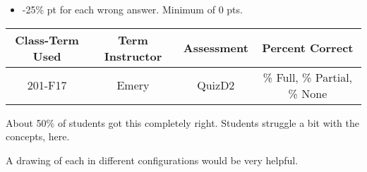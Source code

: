 \begin{rubric}

\begin{itemize}
	\item -25\% pt for each wrong answer. Minimum of 0 pts.
\end{itemize}

\end{rubric}



\begin{outcomes}
	\begin{center}
		\begin{tabular}{cccc}
			\hline\hline
			Class-Term Used & Term Instructor & Assessment & Percent Correct\\
			\hline
			 201-F17 & Emery & QuizD2 & \% Full, \% Partial, \% None\\    %
			\hline
		\end{tabular}
	\end{center}
	
About 50\% of students got this completely right. Students struggle a bit with the concepts, here.

A drawing of each in different configurations would be very helpful.
\end{outcomes}

\begin{comments}

\end{comments}